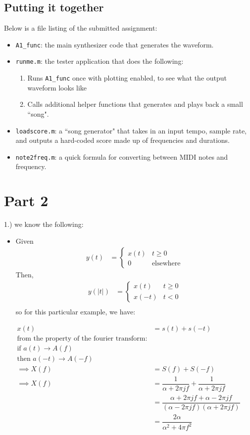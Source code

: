 \documentclass[12pt]{article}
\begin{document}
\subsection*{Putting it together}
Below is a file listing of the submitted assignment:
\begin{itemize}
\item \verb|A1_func|: the main synthesizer code that generates the waveform.
\item \verb|runme.m|: the tester application that does the following:
\begin{enumerate}
	\item 	Runs \verb|A1_func| once with plotting enabled, to see what the output waveform looks like
	\item Calls additional helper functions that generates and plays back a small ``song".
\end{enumerate}
\item \verb|loadscore.m|: a ``song generator" that takes in an input tempo, sample rate, and outputs a hard-coded score made up of frequencies and durations.
\item \verb|note2freq.m|: a quick formula for converting between MIDI notes and frequency.
\end{itemize}

\section*{Part 2}

1.) we know the following:
\begin{itemize}
\item Given
\begin{align*}
y(t) &= \left\lbrace\begin{array}{ll}
x(t) & t\geq 0\\
0 & \text{elsewhere}
\end{array}\right.
\end{align*}
Then,
\begin{align*}
y(|t|) &= \left\lbrace\begin{array}{ll}
x(t) & t\geq 0\\
x(-t) & t < 0
\end{array}\right. \\
\end{align*} 
so for this particular example, we have:
\end{itemize}

\begin{align*}
x(t) &= s(t) + s(-t) \\
\text{from the property of the fourier transform:} \\
\text{if } a(t) \rightarrow A(f) \\
\text{then } a(-t) \rightarrow A(-f) \\
\implies X(f) &= S(f) + S(-f)\\
\implies  X(f) &= \dfrac{1}{\alpha + 2\pi j f} + \dfrac{1}{\alpha + 2\pi j f}\\
&=  \dfrac{\alpha + 2\pi j f + \alpha - 2\pi j f}{(\alpha - 2\pi j f)(\alpha + 2\pi j f)}\\
&= \dfrac{2\alpha}{\alpha^2 + 4\pi f^2}
\end{align*}
\end{document}
